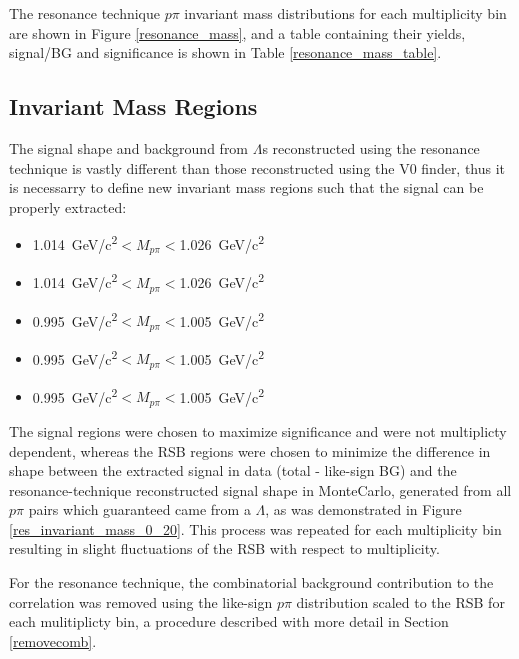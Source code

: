 \documentclass[ALICE,manyauthors]{ALICE_analysis_notes}
\begin{document}
\begin{itemize}
The resonance technique $p\pi$ invariant mass distributions for each multiplicity bin are shown in Figure \ref{resonance_mass}, and a table containing their yields, signal/BG and significance is shown in Table \ref{resonance_mass_table}.


\subsection{Invariant Mass Regions}

The signal shape and background from $\Lambda$s reconstructed using the resonance technique is vastly different than those reconstructed using the V0 finder, thus it is necessarry to define new invariant mass regions such that the signal can be properly extracted:

\begin{itemize}
	\item {}  \SI{1.014}{GeV/c^2}$< M_{p\pi} < $\SI{1.026}{GeV/c^2}
	\item {}  \SI{1.014}{GeV/c^2}$< M_{p\pi} < $\SI{1.026}{GeV/c^2}
	\item  {}  \SI{0.995}{GeV/c^2}$< M_{p\pi} < $\SI{1.005}{GeV/c^2}
	\item  {}  \SI{0.995}{GeV/c^2}$< M_{p\pi} < $\SI{1.005}{GeV/c^2}
	\item  {}  \SI{0.995}{GeV/c^2}$< M_{p\pi} < $\SI{1.005}{GeV/c^2}
\end{itemize}

The signal regions were chosen to maximize significance and were not multiplicty dependent, whereas the RSB regions were chosen to minimize the difference in shape between the extracted signal in data (total - like-sign BG) and the resonance-technique reconstructed signal shape in MonteCarlo, generated from all $p\pi$ pairs which guaranteed came from a $\Lambda$, as was demonstrated in Figure \ref{res_invariant_mass_0_20}. This process was repeated for each multiplicity bin resulting in slight fluctuations of the RSB with respect to multiplicity.

For the resonance technique, the combinatorial background contribution to the correlation was removed using the like-sign $p\pi$ distribution scaled to the RSB for each mulitiplicty bin, a procedure described with more detail in Section \ref{removecomb}.


\end{itemize}
\end{document}
